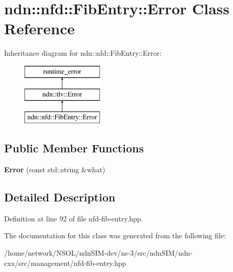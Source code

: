 \hypertarget{classndn_1_1nfd_1_1FibEntry_1_1Error}{}\section{ndn\+:\+:nfd\+:\+:Fib\+Entry\+:\+:Error Class Reference}
\label{classndn_1_1nfd_1_1FibEntry_1_1Error}
Inheritance diagram for ndn\+:\+:nfd\+:\+:Fib\+Entry\+:\+:Error\+:\begin{figure}[H]
\begin{center}
\leavevmode
\includegraphics[height=3.000000cm]{classndn_1_1nfd_1_1FibEntry_1_1Error}
\end{center}
\end{figure}
\subsection*{Public Member Functions}
\begin{DoxyCompactItemize}
\item 
{\bfseries Error} (const std\+::string \&what)\hypertarget{classndn_1_1nfd_1_1FibEntry_1_1Error_a0567966c2638c13728ecd167abd6fab5}{}\label{classndn_1_1nfd_1_1FibEntry_1_1Error_a0567966c2638c13728ecd167abd6fab5}

\end{DoxyCompactItemize}


\subsection{Detailed Description}


Definition at line 92 of file nfd-\/fib-\/entry.\+hpp.



The documentation for this class was generated from the following file\+:\begin{DoxyCompactItemize}
\item 
/home/network/\+N\+S\+O\+L/ndn\+S\+I\+M-\/dev/ns-\/3/src/ndn\+S\+I\+M/ndn-\/cxx/src/management/nfd-\/fib-\/entry.\+hpp\end{DoxyCompactItemize}
